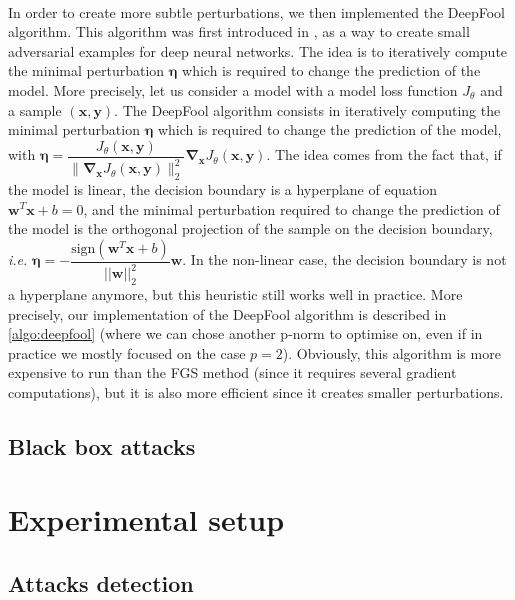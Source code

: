 \documentclass[11pt,twocolumn,letterpaper]{article}
\begin{document}
\paragraph{} In order to create more subtle perturbations, we then implemented the DeepFool algorithm. This algorithm was first introduced in \cite{deepfool}, as a way to create small adversarial examples for deep neural networks. The idea is to iteratively compute the minimal perturbation $\bm{\eta}$ which is required to change the prediction of the model. More precisely, let us consider a model with a model loss function $J_{\theta}$ and a sample $(\bm{x}, \bm{y})$. The DeepFool algorithm consists in iteratively computing the minimal perturbation $\bm{\eta}$ which is required to change the prediction of the model, with $\bm{\eta} = \dfrac{J_{\theta}(\bm{x}, \bm{y})}{\|\bm{\nabla}_{\bm{x}} J_{\theta}(\bm{x}, \bm{y})\|_2^2} \bm{\nabla}_{\bm{x}} J_{\theta}(\bm{x}, \bm{y})$. The idea comes from the fact that, if the model is linear, the decision boundary is a hyperplane of equation $\bm{w}^T\bm{x} + b = 0$, and the minimal perturbation required to change the prediction of the model is the orthogonal projection of the sample on the decision boundary, \textit{i.e.} $\bm{\eta} = - \dfrac{\text{sign}(\bm{w}^T\bm{x} + b)}{||\bm{w}||_2^2} \bm{w}$. In the non-linear case, the decision boundary is not a hyperplane anymore, but this heuristic still works well in practice. More precisely, our implementation of the DeepFool algorithm is described in \ref{algo:deepfool} (where we can chose another p-norm to optimise on, even if in practice we mostly focused on the case $p=2$).
Obviously, this algorithm is more expensive to run than the FGS method (since it requires several gradient computations), but it is also more efficient since it creates smaller perturbations.

\subsection{Black box attacks}

\paragraph{} 


\section{Experimental setup}
\label{sec:setup}

\subsection{Attacks detection}
\end{document}
